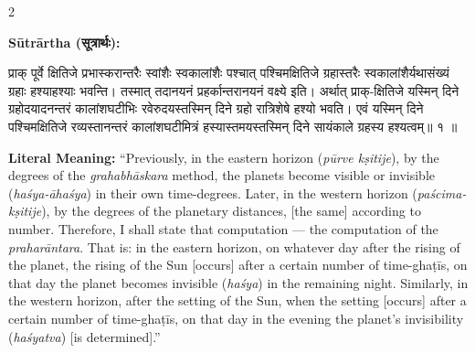 \documentclass[11pt,a4paper]{article}
\newcommand{\dev}[1]{{\devanagarifont #1}}
\newenvironment{sanskritverse}{%
  \begin{center}\begin{minipage}{0.95\textwidth}
  \setlength{\leftskip}{1em}
  \setlength{\rightskip}{1em}
  \dev
}{\end{minipage}\end{center}}
\begin{document}
\begin{paracol}{2}

\noindent\textbf{Sūtrārtha (\dev{सूत्रार्थः}):}
\begin{sanskritverse}
प्राक् पूर्वे क्षितिजे प्रभास्करान्तरैः स्वांशैः स्वकालांशैः पश्चात् पश्चिमक्षितिजे
ग्रहास्तरैः स्वकालांशैर्यथासंख्यं ग्रहाः हश्याहश्याः भवन्ति। तस्मात् तदानयनं
प्रहर्कान्तरानयनं वक्ष्ये इति। अर्थात् प्राक्-क्षितिजे यस्मिन् दिने ग्रहोदयादनन्तरं
कालांशघटीभिः रवेरुदयस्तस्मिन् दिने ग्रहो रात्रिशेषे हश्यो भवति। एवं यस्मिन् दिने
पश्चिमक्षितिजे रव्यस्तानन्तरं कालांशघटीमित्रं हस्यास्तमयस्तस्मिन् दिने सायंकाले
ग्रहस्य हश्यत्वम्॥ १ ॥
\end{sanskritverse}

\switchcolumn

\textbf{Literal Meaning:} ``Previously, in the eastern horizon (\textit{pūrve kṣitije}), by the degrees of the \textit{grahabhāskara} method, the planets become visible or invisible (\textit{haśya-āhaśya}) in their own time-degrees. Later, in the western horizon (\textit{paścima-kṣitije}), by the degrees of the planetary distances, [the same] according to number. Therefore, I shall state that computation --- the computation of the \textit{praharāntara}. That is: in the eastern horizon, on whatever day after the rising of the planet, the rising of the Sun [occurs] after a certain number of time-ghaṭīs, on that day the planet becomes invisible (\textit{haśya}) in the remaining night. Similarly, in the western horizon, after the setting of the Sun, when the setting [occurs] after a certain number of time-ghaṭīs, on that day in the evening the planet's invisibility (\textit{haśyatva}) [is determined].''

\end{paracol}

\vspace{0.5em}
\end{document}
